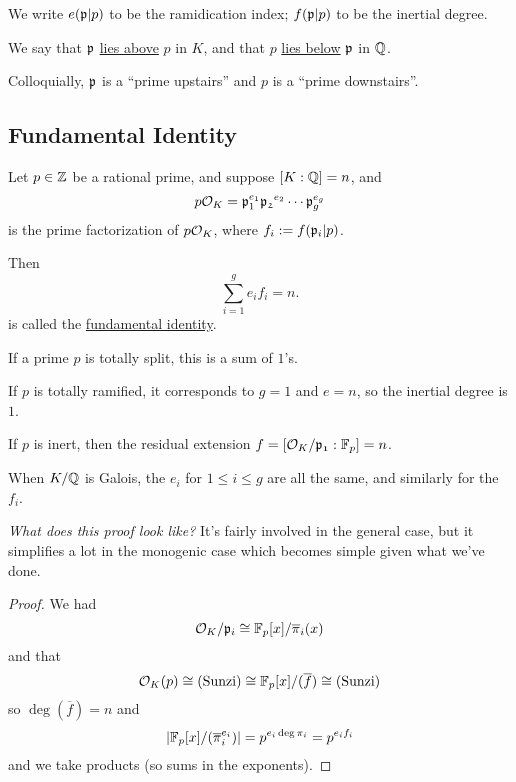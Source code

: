 We write $e(\mathfrak{p} | p)$ to be the ramidication index; $f(\mathfrak{p} | p)$ to be the inertial degree.

We say that $\mathfrak{p}$ \ul{lies above} $p$ in $K$, and that $p$ \ul{lies below} $\mathfrak{p}$ in $\mathbb Q$.

Colloquially, $\mathfrak{p}$ is a ``prime upstairs'' and $p$ is a ``prime downstairs''.

\subsection{Fundamental Identity}

\begin{theorem}
    Let $p\in\mathbb Z$ be a rational prime, and suppose $[K : \mathbb Q] = n$, and
    \[p\mathcal{O}_K = \mathfrak{p}_1^{e_1}\mathfrak{p_2}^{e_2}\cdots \mathfrak{p}_g^{e_g}\]
    is the prime factorization of $p\mathcal{O}_K$, where $f_i := f(\mathfrak{p}_i | p)$.

    Then
    \[\sum_{i = 1}^g e_i f_i = n.\]
    is called the \ul{fundamental identity}.
\end{theorem}
If a prime $p$ is totally split, this is a sum of $1$'s.

If $p$ is totally ramified, it corresponds to $g = 1$ and $e = n$, so the inertial degree is $1$.

If $p$ is inert, then the residual extension $f = [\mathcal{O}_K/\mathfrak{p_1} : \mathbb F_p] = n$.

\begin{remark}
    When $K/\mathbb Q$ is Galois, the $e_i$ for $1\leq i\leq g$ are all the same, and similarly for the $f_i$.
\end{remark}

\emph{What does this proof look like?} It's fairly involved in the general case, but it simplifies a lot in the monogenic case which becomes simple given what we've done.

\begin{proof}
    We had
    \[\mathcal{O}_K / \mathfrak{p}_i \cong \mathbb F_p[x] / \overline{\pi}_i(x)\]
    and that
    \[\mathcal{O}_K(p) \cong (\text{Sunzi})\cong \mathbb F_p[x]/(\overline{f}) \cong (\text{Sunzi})\]
    so $\deg(\overline{f}) = n$ and
    \[\left\lvert\mathbb F_p[x] / (\overline{\pi}_i^{e_i})\right\rvert = p^{e_i \deg \pi_i} = p^{e_i f_i}\]
    and we take products (so sums in the exponents).
\end{proof}
